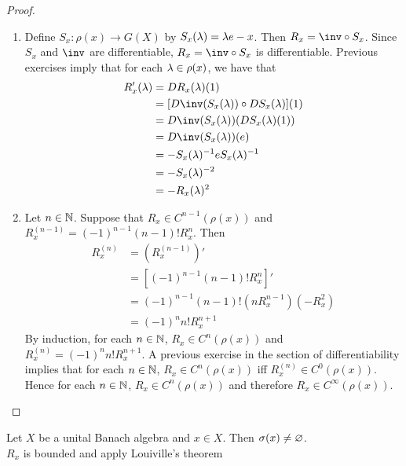 \documentclass{book}
\begin{document}
\begin{proof}\
	\begin{enumerate}
		\item Define $S_x: \rho(x) \rightarrow G(X)$ by $S_x(\lambda) = \lambda e - x$. Then $R_x = \inv \circ S_x$. Since $S_x$ and $\inv$ are differentiable, $R_x = \inv \circ S_x$ is differentiable. Previous exercises imply that for each $\lambda \in \rho(x)$, we have that
		\begin{align*}
			R_x'(\lam)
			& = DR_x(\lam)(1) \\
			& = [D \inv(S_x(\lam)) \circ DS_x(\lam)](1) \\
			& = D \inv(S_x(\lam)) (DS_x(\lam)(1)) \\
			& = D \inv(S_x(\lam)) (e) \\
			& = -S_x(\lam)^{-1} e S_x(\lam)^{-1} \\
			& = -S_x(\lam)^{-2} \\
			& = -R_x(\lam)^2
		\end{align*}
		\item Let $n \in \mathbb{N}$. Suppose that $R_x \in C^{n-1}(\rho(x))$ and $R_x^{(n-1)} =  (-1)^{n-1} (n-1)! R_x^{n}$. Then 
		\begin{align*}
			R_x^{(n)}
			& = (R_x^{(n-1)})' \\
			& = [(-1)^{n-1}(n-1)! R_x^{n}]' \\
			& = (-1)^{n-1}(n-1)! (n R_x^{n-1}) (-R_x^2) \\
			& = (-1)^n n! R_x^{n+1}  
		\end{align*}
		By induction, for each $n \in \mathbb{N}$, $R_x \in C^{n}(\rho(x))$ and $R_x^{(n)} = (-1)^n n! R_x^{n+1}$. A previous exercise in the section of differentiability implies that for each $n \in \mathbb{N}$, $R_x \in C^n(\rho(x))$ iff $R_x^{(n)} \in C^0(\rho(x))$. Hence for each $n \in \mathbb{N}$, $R_x \in C^n(\rho(x))$ and therefore $R_x \in C^{\infty}(\rho(x))$.
	\end{enumerate}
\end{proof}



\begin{ex}
	Let $X$ be a unital Banach algebra and $x \in X$. Then $\sigma(x) \neq \varnothing$. \\
	\tbf{Hint:} $R_x$ is bounded and apply Louiville's theorem
\end{ex}
\end{document}
